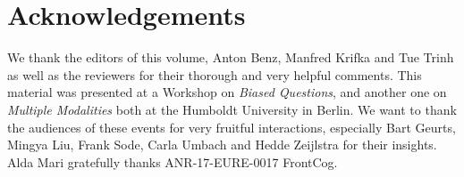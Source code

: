 \documentclass[output=paper,colorlinks,citecolor=brown]{langscibook}
\begin{document}
\section*{Acknowledgements}

We thank the editors of this volume, Anton Benz, Manfred Krifka and Tue Trinh as well as  the reviewers for their thorough and very helpful comments. This material was presented at a Workshop on \textit{Biased Questions}, and another one on \textit{Multiple Modalities} both at the Humboldt University in Berlin. We want to thank the audiences of these events for very fruitful interactions,  especially Bart Geurts, Mingya Liu, Frank Sode, Carla Umbach and Hedde Zeijlstra for their insights. 
Alda Mari gratefully thanks ANR-17-EURE-0017 FrontCog. 


\printbibliography[heading=subbibliography,notkeyword=this]
\end{document}
